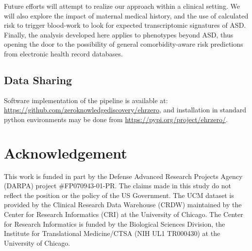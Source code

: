 \documentclass[3p,super,numbers,sort&compress,10pt]{elsarticle}
\begin{document}
Future efforts will attempt to realize our approach within a clinical setting. We will also explore the impact of  maternal medical history, and the  use of calculated risk to trigger   blood-work to look for expected  transcriptomic  signatures of ASD. Finally,  the analysis developed here applies to phenotypes beyond ASD, thus opening the door to the possibility of  general  comorbidity-aware risk predictions  from electronic health record databases.


\subsection*{Data Sharing} Software implementation of the pipeline is available at: \href{https://github.com/zeroknowledgediscovery/ehrzero}{https://github.com/zeroknowledgediscovery/ehrzero}, and installation in standard python environments
may be done from \href{https://pypi.org/project/ehrzero/}{https://pypi.org/project/ehrzero/}.




\def\RIC{\RICTXT}

\def\MXCOL{black}
\def\FXCOL{Orchid3}
\def\MNCOL{SeaGreen4}
\def\FNCOL{SeaGreen4}
\def\NCOL{SeaGreen4}
\def\XCOL{Tomato}
\def\WCOL{Tomato}
\def\YCOL{DodgerBlue4}
\def\TEXTCOL{gray}
\def\AXISCOL{white}






\section*{Acknowledgement}
This work is funded in part by the Defense Advanced Research Projects Agency (DARPA) project \#FP070943-01-PR. The claims made in this study  do not  reflect the position or the policy of the US Government. The UCM dataset is provided by the Clinical Research Data Warehouse (CRDW) maintained by the Center for Research Informatics (CRI) at the  University of Chicago. The Center for Research Informatics is funded by the Biological Sciences Division, the Institute for Translational Medicine/CTSA (NIH UL1 TR000430) at the University of Chicago. 




%
% 
\end{document}
